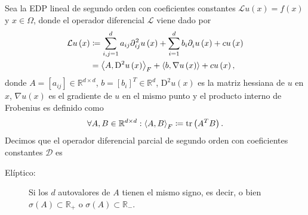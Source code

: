 \begin{definition}
    Sea la EDP lineal de segundo orden con coeficientes constantes
    \begin{math}
        \mathcal{L}u\left(x\right)=
        f\left(x\right)
    \end{math}
    y $x\in\Omega$, donde el operador diferencial $\mathcal{L}$ viene
    dado por
    \begin{align*}
        \mathcal{L}
        u\left(x\right) & \coloneqq
        \sum_{i,j=1}^{d}
        a_{ij}
        \difcp[2]{u}{ij}\left(x\right)+
        \sum_{i=1}^{d}
        b_{i}
        \difcp{u}{i}\left(x\right)+
        cu\left(x\right)            \\
                        & =
        {
        \inner{A}{\mathrm{D}^{2}u\left(x\right)}
        }_{F}+
        \inner{b}{\nabla u\left(x\right)}+
        c
        u\left(x\right),
    \end{align*}
    donde $A=\left[a_{ij}\right]\in\mathbb{R}^{d\times d}$,
    \begin{math}
        b={\left[b_{i}\right]}^{T}\in\mathbb{R}^{d}
    \end{math},
    \begin{math}
        \mathrm{D}^{2}u\left(x\right)
    \end{math}
    es la matriz hessiana de $u$ en $x$,
    \begin{math}
        \nabla u\left(x\right)
    \end{math}
    es el gradiente de $u$ en el mismo punto y el producto interno de
    Frobenius es definido como
    \begin{equation*}
        \forall A,B\in\mathbb{R}^{d\times d}:
        {\inner{A}{B}}_{F}\coloneqq
        \operatorname{tr}
        \left(A^{T}B\right).
    \end{equation*}
    Decimos que el operador diferencial parcial de segundo orden con
    coeficientes constantes $\mathcal{D}$ es
    \begin{description}
        \item[Elíptico:]

            Si los $d$ autovalores de $A$ tienen el mismo signo, es
            decir, o bien
            \begin{math}
                \sigma\left(A\right)\subset\mathbb{R}_{+}
            \end{math}
            o
            \begin{math}
                \sigma\left(A\right)\subset\mathbb{R}_{-}
            \end{math}.


\end{description}
\end{definition}

